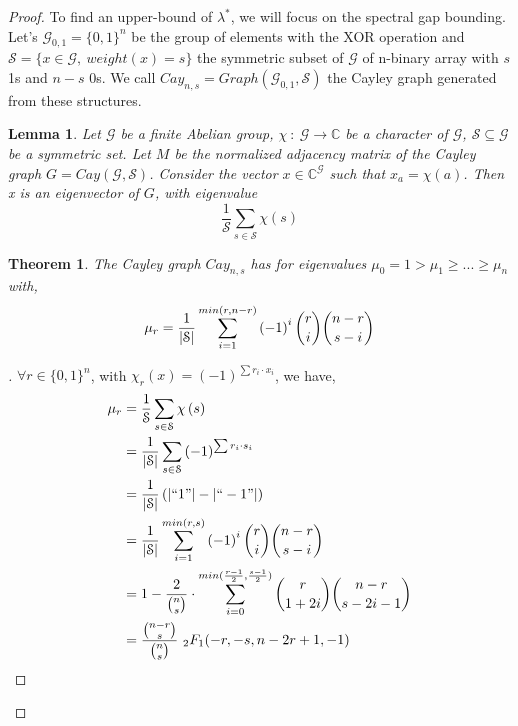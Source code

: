 \documentclass[USenglish,oneside,twocolumn]{article}
\newtheorem{lemma}{Lemma}
\newtheorem{theorem}{Theorem}
\newenvironment{subproof}[1][\proofname]{%
  \renewcommand{\qedsymbol}{$\blacksquare$}%
  \begin{proof}[#1]%
}{%
  \end{proof}%
}
\begin{document}
\begin{proof}
To find an upper-bound of $\lambda^*$, we will focus on the spectral gap bounding.
Let's $\mathcal{G}_{0,1}=\{0,1\}^n$ be the group of elements with the XOR operation and $\mathcal{S}=\{x \in \mathcal{G},\ weight(x)=s\}$ the symmetric subset of $\mathcal{G}$ of n-binary array with $s$ 1s and $n-s$ 0s.
We call $Cay_{n,s}=Graph\left(  \mathcal{G}_{0,1}, \mathcal{S} \right) $ the Cayley graph generated from these structures.

\begin{lemma}
Let $\mathcal{G}$ be a finite Abelian group, $\chi\ :\  \mathcal{G} \rightarrow \mathbb{C}$ be a character of $\mathcal{G}$, $\mathcal{S} \subseteq \mathcal{G}$ be a symmetric set.
Let $M$ be the normalized adjacency matrix of the Cayley graph $G = Cay(\mathcal{G},\mathcal{S})$.
Consider the vector $x \in \mathbb{C}^\mathcal{G}$ such that $x_a = \chi(a)$. Then x is an eigenvector of $G$, with eigenvalue $$ \frac{1}{\mathcal{S}} \sum_{s\in \mathcal{S}} \chi\left(s\right)$$
\end{lemma}

\begin{theorem}
The Cayley graph $Cay_{n,s}$ has for eigenvalues $\mu_0 = 1 > \mu_1 \geq ... \geq \mu_n$ with, 
$$\mu_r = \frac{1}{\left | \mathcal{S} \right |} \sum_{i=1}^{min(r, n-r)} \left ( -1 \right )^i {r \choose i}{n-r \choose s-i}\\$$
\end{theorem}

\begin{subproof}
$\forall r \in \{0,1\}^n$, with $\chi_r(x)=\left ( -1 \right )^{\sum r_i \cdot x_i}$, we have,
\begin{align*}
\mu_r &= \frac{1}{\mathcal{S}} \sum_{s\in \mathcal{S}} \chi\left(s\right) \\
&= \frac{1}{\left | \mathcal{S} \right |} \sum_{s\in \mathcal{S}} \left ( -1 \right )^{\sum r_i \cdot s_i} \\
&=  \frac{1}{\left | \mathcal{S} \right |} \left ( \left | ``1" \right | - \left | ``-1"  \right| \right ) \\
&= \frac{1}{\left | \mathcal{S} \right |} \sum_{i=1}^{min(r, s)} \left ( -1 \right )^i {r \choose i}{n-r \choose s-i} \\
&= 1 - \frac{2}{{n \choose s}} \cdot \sum_{i=0}^{min(\frac{r-1}{2}, \frac{s-1}{2})} {r \choose 1+2i}{n-r \choose s-2i-1} \\
&= \frac{{n-r \choose s}}{{n \choose s}} \ _2F_1(-r,-s,n-2r+1,-1)
\end{align*}
\end{subproof}



\end{proof}
\end{document}

